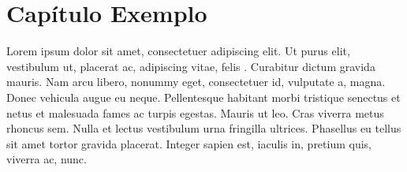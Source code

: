 %
%
% 
%

\chapter{Capítulo Exemplo}
\noindent
Lorem ipsum dolor sit amet, consectetuer adipiscing elit. Ut purus elit, vestibulum ut, placerat ac, adipiscing vitae, felis \citep{Salles2014}. Curabitur dictum gravida mauris. Nam arcu libero, nonummy eget, consectetuer id, vulputate a, magna. Donec vehicula augue eu neque. Pellentesque habitant morbi tristique senectus et netus et malesuada fames ac turpis egestas. Mauris ut leo. Cras viverra metus rhoncus sem. Nulla et lectus vestibulum urna fringilla ultrices. Phasellus eu tellus sit amet tortor gravida placerat. Integer sapien est, iaculis in, pretium quis, viverra ac, nunc.

